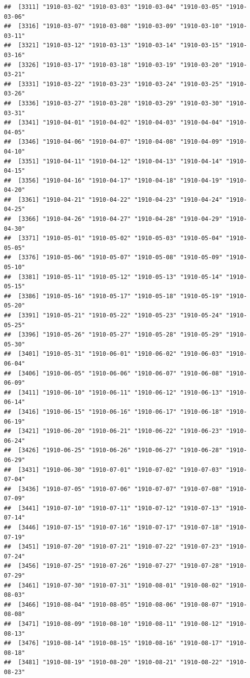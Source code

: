 \documentclass{article}\usepackage[]{graphicx}\usepackage[]{color}
\makeatletter
\newenvironment{kframe}{%
 \def\at@end@of@kframe{}%
 \ifinner\ifhmode%
  \def\at@end@of@kframe{\end{minipage}}%
  \begin{minipage}{\columnwidth}%
 \fi\fi%
 \def\FrameCommand##1{\hskip\@totalleftmargin \hskip-\fboxsep
 \colorbox{shadecolor}{##1}\hskip-\fboxsep
     \hskip-\linewidth \hskip-\@totalleftmargin \hskip\columnwidth}%
 \MakeFramed {\advance\hsize-\width
   \@totalleftmargin\z@ \linewidth\hsize
   \@setminipage}}%
 {\par\unskip\endMakeFramed%
 \at@end@of@kframe}
\newenvironment{knitrout}{}{} %
\makeatother
\begin{document}
\begin{description}
\begin{knitrout}
\begin{kframe}
\begin{verbatim}
##  [3311] "1910-03-02" "1910-03-03" "1910-03-04" "1910-03-05" "1910-03-06"
##  [3316] "1910-03-07" "1910-03-08" "1910-03-09" "1910-03-10" "1910-03-11"
##  [3321] "1910-03-12" "1910-03-13" "1910-03-14" "1910-03-15" "1910-03-16"
##  [3326] "1910-03-17" "1910-03-18" "1910-03-19" "1910-03-20" "1910-03-21"
##  [3331] "1910-03-22" "1910-03-23" "1910-03-24" "1910-03-25" "1910-03-26"
##  [3336] "1910-03-27" "1910-03-28" "1910-03-29" "1910-03-30" "1910-03-31"
##  [3341] "1910-04-01" "1910-04-02" "1910-04-03" "1910-04-04" "1910-04-05"
##  [3346] "1910-04-06" "1910-04-07" "1910-04-08" "1910-04-09" "1910-04-10"
##  [3351] "1910-04-11" "1910-04-12" "1910-04-13" "1910-04-14" "1910-04-15"
##  [3356] "1910-04-16" "1910-04-17" "1910-04-18" "1910-04-19" "1910-04-20"
##  [3361] "1910-04-21" "1910-04-22" "1910-04-23" "1910-04-24" "1910-04-25"
##  [3366] "1910-04-26" "1910-04-27" "1910-04-28" "1910-04-29" "1910-04-30"
##  [3371] "1910-05-01" "1910-05-02" "1910-05-03" "1910-05-04" "1910-05-05"
##  [3376] "1910-05-06" "1910-05-07" "1910-05-08" "1910-05-09" "1910-05-10"
##  [3381] "1910-05-11" "1910-05-12" "1910-05-13" "1910-05-14" "1910-05-15"
##  [3386] "1910-05-16" "1910-05-17" "1910-05-18" "1910-05-19" "1910-05-20"
##  [3391] "1910-05-21" "1910-05-22" "1910-05-23" "1910-05-24" "1910-05-25"
##  [3396] "1910-05-26" "1910-05-27" "1910-05-28" "1910-05-29" "1910-05-30"
##  [3401] "1910-05-31" "1910-06-01" "1910-06-02" "1910-06-03" "1910-06-04"
##  [3406] "1910-06-05" "1910-06-06" "1910-06-07" "1910-06-08" "1910-06-09"
##  [3411] "1910-06-10" "1910-06-11" "1910-06-12" "1910-06-13" "1910-06-14"
##  [3416] "1910-06-15" "1910-06-16" "1910-06-17" "1910-06-18" "1910-06-19"
##  [3421] "1910-06-20" "1910-06-21" "1910-06-22" "1910-06-23" "1910-06-24"
##  [3426] "1910-06-25" "1910-06-26" "1910-06-27" "1910-06-28" "1910-06-29"
##  [3431] "1910-06-30" "1910-07-01" "1910-07-02" "1910-07-03" "1910-07-04"
##  [3436] "1910-07-05" "1910-07-06" "1910-07-07" "1910-07-08" "1910-07-09"
##  [3441] "1910-07-10" "1910-07-11" "1910-07-12" "1910-07-13" "1910-07-14"
##  [3446] "1910-07-15" "1910-07-16" "1910-07-17" "1910-07-18" "1910-07-19"
##  [3451] "1910-07-20" "1910-07-21" "1910-07-22" "1910-07-23" "1910-07-24"
##  [3456] "1910-07-25" "1910-07-26" "1910-07-27" "1910-07-28" "1910-07-29"
##  [3461] "1910-07-30" "1910-07-31" "1910-08-01" "1910-08-02" "1910-08-03"
##  [3466] "1910-08-04" "1910-08-05" "1910-08-06" "1910-08-07" "1910-08-08"
##  [3471] "1910-08-09" "1910-08-10" "1910-08-11" "1910-08-12" "1910-08-13"
##  [3476] "1910-08-14" "1910-08-15" "1910-08-16" "1910-08-17" "1910-08-18"
##  [3481] "1910-08-19" "1910-08-20" "1910-08-21" "1910-08-22" "1910-08-23"

\end{verbatim}
\end{kframe}
\end{knitrout}
\end{description}
\end{document}
